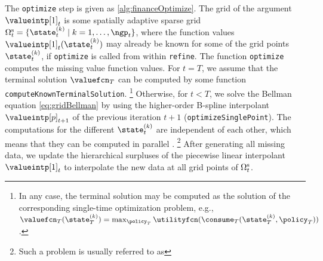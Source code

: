 The \texttt{optimize} step is given as \cref{alg:financeOptimize}.
The grid of the argument $\valueintp[1]_t$
is some spatially adaptive sparse grid
$\gridset{t}{\sparse}
= \{\state_t^{(k)} \mid k = 1, \dotsc, \ngp_t\}$,
where the function values $\valueintp[1]_t(\state_t^{(k)})$
may already be known for some of the grid points $\state_t^{(k)}$,
if \texttt{optimize} is called from within \texttt{refine}.
The function \texttt{optimize} computes the missing value function values.
For $t = T$, we assume that the terminal solution
$\valuefcn_T$ can be computed by some function
\texttt{computeKnownTerminalSolution}.%
\footnote{%
  In any case, the terminal solution may be computed as the
  solution of the corresponding single-time optimization problem,
  e.g., $\valuefcn_T(\state_T^{(k)})
  = \max_{\policy_T} \utilityfcn(\consume_T(\state_T^{(k)}, \policy_T))$.%
}
Otherwise, for $t < T$, we solve the Bellman equation
\eqref{eq:gridBellman} by using the higher-order B-spline interpolant
$\valueintp[p]_{t+1}$ of the previous iteration $t + 1$
(\texttt{optimizeSinglePoint}).
The computations for the different $\state_t^{(k)}$ are
independent of each other,
which means that they can be computed in parallel \cite{Horneff16Efficient}.%
\footnote{%
  Such a problem is usually referred to as %
}
After generating all missing data,
we update the hierarchical surpluses of the
piecewise linear interpolant $\valueintp[1]_t$
to interpolate the new data at all grid points of $\gridset{t}{\sparse}$.

